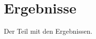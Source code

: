 \documentclass[../Abschlussarbeit.tex]{subfiles}
\begin{document}
\section{Ergebnisse}
Der Teil mit den Ergebnissen.
\end{document}
